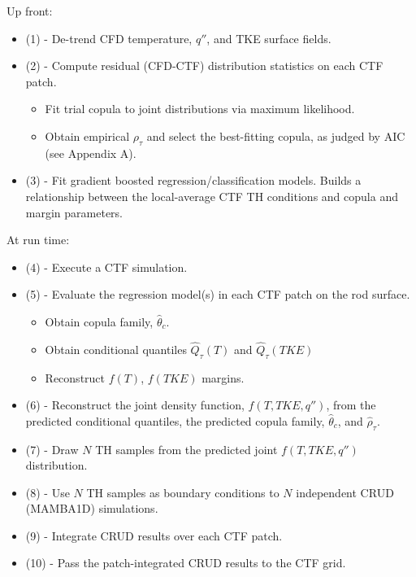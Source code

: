 Up front:
\begin{itemize}
\item (1) - De-trend CFD temperature, $q''$, and TKE surface fields.	
\item (2) - Compute residual (CFD-CTF) distribution statistics on each CTF patch.
	\begin{itemize}
	\item  Fit trial copula to joint distributions via maximum likelihood. 
	\item  Obtain empirical $\rho_\tau$ and select the best-fitting copula, as judged by AIC (see Appendix A). 
	\end{itemize}
\item (3) - Fit gradient boosted regression/classification models.  Builds a relationship between the local-average CTF TH conditions and copula and margin parameters.
\end{itemize}
At run time:
\begin{itemize}
\item (4) - Execute a CTF simulation.
\item (5) - Evaluate the regression model(s) in each CTF patch on the rod surface.
	\begin{itemize}
	\item  Obtain copula family, $\hat \theta_c$.
	\item  Obtain conditional quantiles $\hat Q_\tau(T)$ and $\hat Q_\tau(TKE)$ 
	\item  Reconstruct $f(T)$, $f(TKE)$ margins.
	\end{itemize}
\item (6) - Reconstruct the joint density function, $f(T, TKE, q'')$, from the predicted conditional quantiles, the predicted copula family, $\hat \theta_c$, and $\hat \rho_\tau$.
\item (7) - Draw $N$ TH samples from the predicted joint $f(T, TKE, q'')$ distribution.  
\item (8) - Use $N$ TH samples as boundary conditions to $N$ independent CRUD (MAMBA1D) simulations.
\item (9) - Integrate CRUD results over each CTF patch.
\item (10) - Pass the patch-integrated CRUD results to the CTF grid.
\end{itemize}
